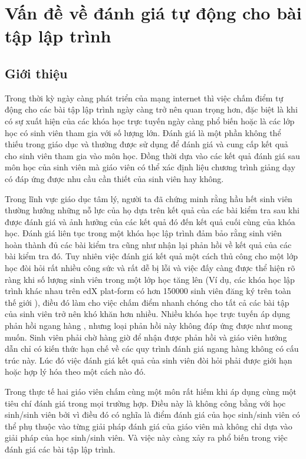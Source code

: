 \documentclass[12pt,a4paper]{article}
\author{Huu Tai}
\begin{document}
\tableofcontents \newpage

\section{Vấn đề về đánh giá tự động cho bài tập lập trình}

\subsection{Giới thiệu}
Trong thời kỳ ngày càng phát triển của mạng internet thì việc chấm điểm tự động cho các bài tập lập trình ngày càng trở nên quan trọng hơn, đặc biệt là khi có sự xuất hiện của các khóa học trực tuyến ngày càng phổ biến hoặc là các lớp học có sinh viên tham gia với số lượng lớn. Đánh giá là một phần không thể thiếu trong giáo dục và thường được sử dụng để đánh giá và cung cấp kết quả cho sinh viên tham gia vào môn học. Đồng thời dựa vào các kết quả đánh giá sau môn học của sinh viên mà giáo viên có thể xác định liệu chương trình giảng dạy có đáp ứng được nhu cầu cần thiết của sinh viên hay không.

\indent Trong lĩnh vực giáo dục tâm lý, người ta đã chứng minh rằng hầu hết sinh viên thường hướng những nỗ lực của họ dựa trên kết quả của các bài kiểm tra sau khi được đánh giá và ảnh hưởng của các kết quả đó đến kết quả cuối cùng của khóa học. Đánh giá liên tục trong một khóa học lập trình đảm bảo rằng sinh viên hoàn thành đủ các bài kiểm tra cũng như nhận lại phản hồi về kết quả của các bài kiểm tra đó. Tuy nhiên việc đánh giá kết quả một cách thủ công cho một lớp học đòi hỏi rất nhiều công sức và rất dễ bị lỗi và việc đấy càng được thể hiện rõ ràng khi số lượng sinh viên trong một lớp học tăng lên (Ví dụ, các khóa học lập trình khác nhau trên edX plat-form có hơn 150000 sinh viên đăng ký trên toàn thế giới \cite{liu2019automatic}), điều đó làm cho việc chấm điểm nhanh chóng cho tất cả các bài tập của sinh viên trở nên khó khăn hơn nhiều. Nhiều khóa học trực tuyến áp dụng phản hồi ngang hàng \cite{weld2012personalized}, nhưng loại phản hồi này không đáp ứng được như mong muốn. Sinh viên phải chờ hàng giờ để nhận được phản hồi và giáo viên hướng dẫn chỉ có kiến thức hạn chế về các quy trình đánh giá ngang hàng không có cấu trúc này. Lúc đó việc đánh giá kết quả của sinh viên đòi hỏi phải được giới hạn hoặc hợp lý hóa theo một cách nào đó.

\indent Trong thực tế hai giáo viên chấm cùng một môn rất hiếm khi áp dụng cùng một tiêu chí đánh giá trong mọi trường hợp. Điều này là không công bằng với học sinh/sinh viên bởi vì điều đó có nghĩa là điểm đánh giá của học sinh/sinh viên có thể phụ thuộc vào từng giải pháp đánh giá của giáo viên mà không chỉ dựa vào giải pháp của học sinh/sinh viên. Và việc này càng xảy ra phổ biến trong việc đánh giá các bài tập lập trình.
\end{document}
